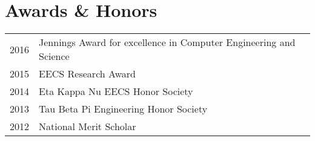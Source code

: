 \documentclass[letterpaper]{deedy-resume} %
\begin{document}
\begin{minipage}[t]{0.66\textwidth}
\sectionspace %


\section{Awards \& Honors}

\begin{tabular}{rll}
2016 & Jennings Award for excellence in Computer Engineering and Science \\
2015 & EECS Research Award \\
2014 & Eta Kappa Nu EECS Honor Society\\
2013 & Tau Beta Pi Engineering Honor Society\\
2012 & National Merit Scholar
\end{tabular}

\sectionspace %


\end{minipage} %








\end{document}
